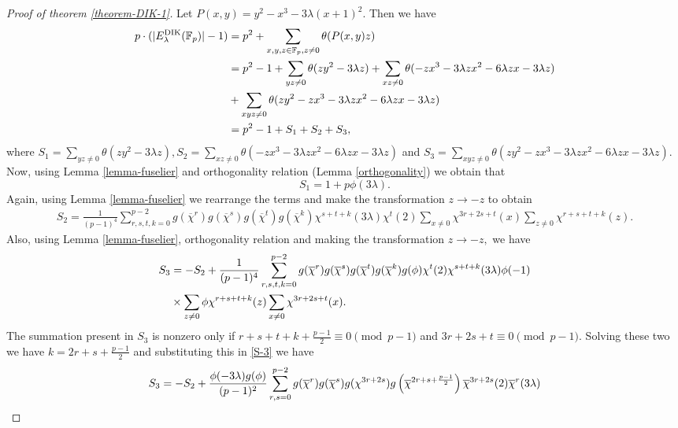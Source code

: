 \documentclass[12pt]{amsart}
\theoremstyle{plain}
\theoremstyle{definition}
\theoremstyle{remark}
\newcommand{\F}{\mathbb{F}}
\newcommand{\dik}{\text{{\rm{DIK}}}}
\numberwithin{equation}{section}
\begin{document}
\begin{proof}[Proof of theorem \ref{theorem-DIK-1}] Let $P(x,y)=y^2-x^3-3\lambda(x+1)^2.$ Then we have 
\begin{align}\label{eqn-main}
p\cdot(|E^{\dik}_{\lambda}(\F_p)|-1)&=p^2+\sum\limits_{x,y,z\in\F_p, z\neq0}\theta(P(x,y)z)\notag\\
&=p^2-1+\sum_{yz\neq0}\theta(zy^2-3\lambda z)+\sum_{xz\neq0}\theta(-zx^3-3\lambda zx^2-6\lambda zx-3\lambda z)\notag\\
&+\sum_{xyz\neq0}\theta(zy^2-zx^3-3\lambda zx^2-6\lambda zx-3\lambda z)\notag\\
&=p^2-1+S_1+S_2+S_3,
\end{align}
where $S_1=\sum\limits_{yz\neq0}\theta(zy^2-3\lambda z), S_2=\sum\limits_{xz\neq0}\theta(-zx^3-3\lambda zx^2-6\lambda zx-3\lambda z)$ and $S_3=\sum\limits_{xyz\neq0}\theta(zy^2-zx^3-3\lambda zx^2-6\lambda zx-3\lambda z).$
Now, using Lemma \ref{lemma-fuselier} and orthogonality relation (Lemma \ref{orthogonality}) we obtain that $$S_1=1+p\phi(3\lambda).$$ 
Again, using  Lemma \ref{lemma-fuselier} we rearrange the terms and make the transformation $z\rightarrow-z$ to obtain  
\begin{align}\label{S-2}
S_2=\frac{1}{(p-1)^4} \sum_{r,s,t,k=0}^{p-2}g(\overline{\chi}^{r}) g(\overline{\chi}^{s}) g(\overline{\chi}^{t}) g(\overline{\chi}^{k})
    \chi^{s+t+k} (3\lambda ) \chi^t (2)\sum_{x\neq0}\chi^{3r+2s+t}(x)\sum_{z\neq0} \chi^{r+s+t+k} (z).
\end{align}
Also, using Lemma \ref{lemma-fuselier}, orthogonality relation and making the transformation $z\rightarrow-z,$ we have 
\begin{align}\label{S-3}
S_3&=-S_2+\frac{1}{(p-1)^4} \sum_{r,s,t,k=0}^{p-2}  g(\overline{\chi}^{r})g(\overline{\chi}^{s}) g(\overline{\chi}^{t}) g(\overline{\chi}^{k}) g(\phi)\chi^t(2)  \chi^{s+t+k} (3\lambda) \phi(-1) \notag\\ 
&\times \sum_{z\neq0} \phi\chi^{r+s+t+k} (z)    \sum_{x\neq0} \chi^{3r+2s+t} (x).
\end{align}
The summation present in $S_3$ is nonzero only if $r+s+t+k+\frac{p-1}{2}\equiv0\pmod{p-1}$ and $3r+2s+t\equiv0\pmod{p-1}.$ Solving these two we have  $k =2r+s+\frac{p-1}{2}$ and substituting this in \eqref{S-3} we have 
\begin{align}\label{S-3-final}
S_3&= -S_2+ \frac{\phi(-3\lambda)g(\phi)}{(p-1)^2} \sum_{r,s=0}^{p-2} g(\overline{\chi}^{r}) g(\overline{\chi}^{s}) g(\chi^{3r+2s}) g\left(\overline{\chi}^{2r + s + \frac{p-1}{2}}\right) \overline{\chi}^{3r+2s}(2)\overline{\chi}^{r}(3\lambda)\notag\\

\end{align}
\end{proof}
\end{document}
